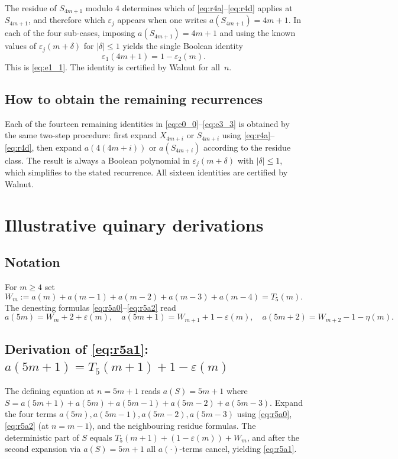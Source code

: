 \documentclass[12pt]{article}
\theoremstyle{definition}
\theoremstyle{remark}
\begin{document}
The residue of $S_{4m+1}$ modulo $4$ determines which of \eqref{eq:r4a}--\eqref{eq:r4d}
applies at $S_{4m+1}$, and therefore which $\varepsilon_j$ appears when one writes
$a(S_{4m+1})=4m+1$. In each of the four sub-cases, imposing $a(S_{4m+1})=4m+1$
and using the known values of $\varepsilon_j(m+\delta)$ for $|\delta|\le 1$ yields
the single Boolean identity
\[
  \varepsilon_1(4m+1) = 1-\varepsilon_2(m).
\]
This is \eqref{eq:e1_1}. The identity is certified by Walnut for all~$n$.

\subsection*{How to obtain the remaining recurrences}
Each of the fourteen remaining identities in \eqref{eq:e0_0}--\eqref{eq:e3_3} is
obtained by the same two-step procedure: first expand $X_{4m+i}$ or $S_{4m+i}$ using
\eqref{eq:r4a}--\eqref{eq:r4d}, then expand $a(4(4m+i))$ or $a(S_{4m+i})$
according to the residue class. The result is always a Boolean polynomial
in $\varepsilon_j(m+\delta)$ with $|\delta|\le 1$, which simplifies to the
stated recurrence. All sixteen identities are certified by Walnut.

\section{Illustrative quinary derivations}\label{app:r5-deriv}

\subsection*{Notation}

For $m\ge 4$ set
\[
  W_m := a(m)+a(m-1)+a(m-2)+a(m-3)+a(m-4) = T_5(m).
\]
The denesting formulas \eqref{eq:r5a0}--\eqref{eq:r5a2} read
\[
  a(5m) = W_m+2+\varepsilon(m),\quad
  a(5m+1) = W_{m+1}+1-\varepsilon(m),\quad
  a(5m+2) = W_{m+2}-1-\eta(m).
\]

\subsection*{Derivation of \eqref{eq:r5a1}: $a(5m+1)=T_5(m+1)+1-\varepsilon(m)$}

The defining equation at $n=5m+1$ reads
$a(S)=5m+1$ where $S=a(5m+1)+a(5m)+a(5m-1)+a(5m-2)+a(5m-3)$.
Expand the four terms $a(5m),a(5m-1),a(5m-2),a(5m-3)$ using
\eqref{eq:r5a0}, \eqref{eq:r5a2} (at $n=m-1$), and the neighbouring residue
formulas. The deterministic part of $S$ equals $T_5(m+1)+(1-\varepsilon(m))+W_m$,
and after the second expansion via $a(S)=5m+1$ all $a(\cdot)$-terms cancel,
yielding \eqref{eq:r5a1}.
\end{document}
